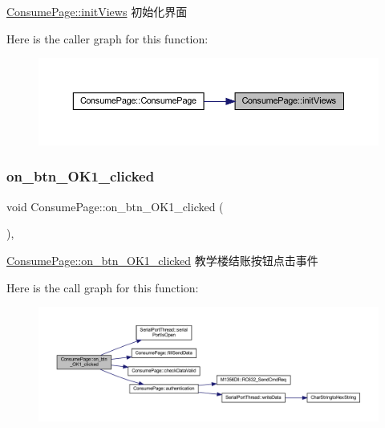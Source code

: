 \mbox{\hyperlink{class_consume_page_a53f5ce5e4192a56330fac399aa43c199}{Consume\+Page\+::init\+Views}} 初始化界面 

Here is the caller graph for this function\+:
\nopagebreak
\begin{figure}[H]
\begin{center}
\leavevmode
\includegraphics[width=350pt]{class_consume_page_a53f5ce5e4192a56330fac399aa43c199_icgraph}
\end{center}
\end{figure}
\mbox{\label{class_consume_page_aef47c443ac40ea430537571bae1328ff}} 
\subsubsection{\texorpdfstring{on\_btn\_OK1\_clicked}{on\_btn\_OK1\_clicked}}
{\footnotesize\ttfamily void Consume\+Page\+::on\+\_\+btn\+\_\+\+O\+K1\+\_\+clicked (\begin{DoxyParamCaption}{ }\end{DoxyParamCaption})\hspace{0.3cm}{\ttfamily [private]}, {\ttfamily [slot]}}



\mbox{\hyperlink{class_consume_page_aef47c443ac40ea430537571bae1328ff}{Consume\+Page\+::on\+\_\+btn\+\_\+\+O\+K1\+\_\+clicked}} 教学楼结账按钮点击事件 

Here is the call graph for this function\+:
\nopagebreak
\begin{figure}[H]
\begin{center}
\leavevmode
\includegraphics[width=350pt]{class_consume_page_aef47c443ac40ea430537571bae1328ff_cgraph}
\end{center}
\end{figure}
\mbox{\label{class_consume_page_a9ace94ec565505f97e29f0f732ef13bf}} 
